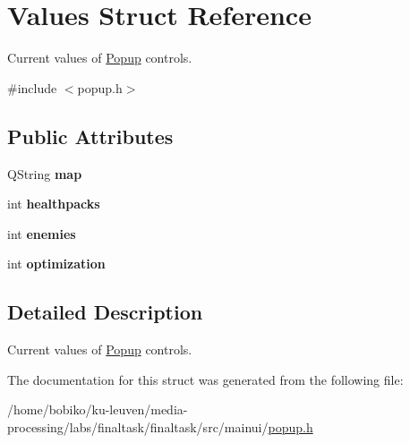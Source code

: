 \hypertarget{structValues}{}\section{Values Struct Reference}
\label{structValues}


Current values of \hyperlink{classPopup}{Popup} controls.  




{\ttfamily \#include $<$popup.\+h$>$}

\subsection*{Public Attributes}
\begin{DoxyCompactItemize}
\item 
Q\+String {\bfseries map}\hypertarget{structValues_a9599915bd0bd7b31ea73038ebcd2fc7f}{}\label{structValues_a9599915bd0bd7b31ea73038ebcd2fc7f}

\item 
int {\bfseries healthpacks}\hypertarget{structValues_ab3bb6a5ee626c6778831a30dfaf2fb72}{}\label{structValues_ab3bb6a5ee626c6778831a30dfaf2fb72}

\item 
int {\bfseries enemies}\hypertarget{structValues_a7a02de91e3e76a3e0e3a8be5d4c5bf75}{}\label{structValues_a7a02de91e3e76a3e0e3a8be5d4c5bf75}

\item 
int {\bfseries optimization}\hypertarget{structValues_a43becf75ca7a69cbdbb8cbfa7ef7bfea}{}\label{structValues_a43becf75ca7a69cbdbb8cbfa7ef7bfea}

\end{DoxyCompactItemize}


\subsection{Detailed Description}
Current values of \hyperlink{classPopup}{Popup} controls. 

The documentation for this struct was generated from the following file\+:\begin{DoxyCompactItemize}
\item 
/home/bobiko/ku-\/leuven/media-\/processing/labs/finaltask/finaltask/src/mainui/\hyperlink{popup_8h}{popup.\+h}\end{DoxyCompactItemize}
